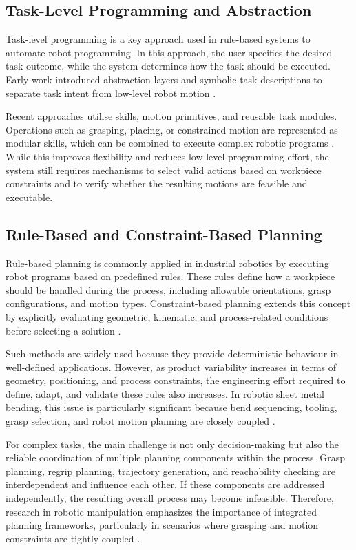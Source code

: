 \subsection{Task-Level Programming and Abstraction}
\label{subsec:task-level-programming-abstraction}

Task-level programming is a key approach used in rule-based systems to automate robot programming. In this approach, the user specifies the desired task outcome, while the system determines how the task should be executed. Early work introduced abstraction layers and symbolic task descriptions to separate task intent from low-level robot motion \cite{LozanoPerez1983}.

Recent approaches utilise skills, motion primitives, and reusable task modules. Operations such as grasping, placing, or constrained motion are represented as modular skills, which can be combined to execute complex robotic programs \cite{Kruger2019}. While this improves flexibility and reduces low-level programming effort, the system still requires mechanisms to select valid actions based on workpiece constraints and to verify whether the resulting motions are feasible and executable.

\subsection{Rule-Based and Constraint-Based Planning}
\label{subsec:rule-based-constraint-based-planning}

Rule-based planning is commonly applied in industrial robotics by executing robot programs based on predefined rules. These rules define how a workpiece should be handled during the process, including allowable orientations, grasp configurations, and motion types. Constraint-based planning extends this concept by explicitly evaluating geometric, kinematic, and process-related conditions before selecting a solution \cite{Pan2012Survey}.

Such methods are widely used because they provide deterministic behaviour in well-defined applications. However, as product variability increases in terms of geometry, positioning, and process constraints, the engineering effort required to define, adapt, and validate these rules also increases. In robotic sheet metal bending, this issue is particularly significant because bend sequencing, tooling, grasp selection, and robot motion planning are closely coupled \cite{Pan2012Survey,Gupta1998SheetMetalBending}.

For complex tasks, the main challenge is not only decision-making but also the reliable coordination of multiple planning components within the process. Grasp planning, regrip planning, trajectory generation, and reachability checking are interdependent and influence each other. If these components are addressed independently, the resulting overall process may become infeasible. Therefore, research in robotic manipulation emphasizes the importance of integrated planning frameworks, particularly in scenarios where grasping and motion constraints are tightly coupled \cite{bohg2014data}.

